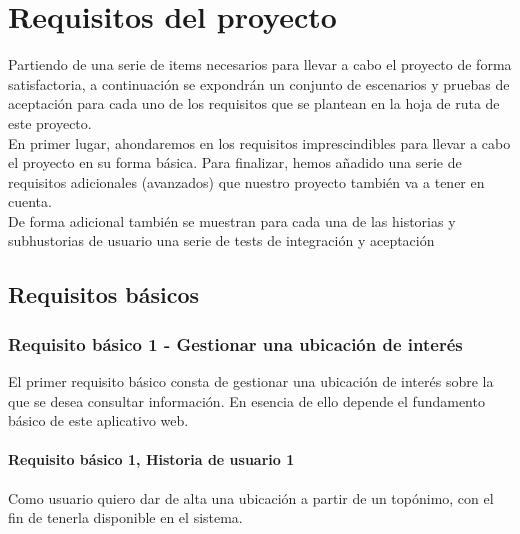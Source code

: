 \documentclass[../ei103948-project-documentation.tex]{subfiles}
\begin{document}
\section{Requisitos del proyecto}
	Partiendo de una serie de items necesarios para llevar a cabo el proyecto de forma satisfactoria, a continuación se expondrán un conjunto de escenarios y pruebas de aceptación para cada uno de los requisitos que se plantean en la hoja de ruta de este proyecto.\\

	En primer lugar, ahondaremos en los requisitos imprescindibles para llevar a cabo el proyecto en su forma básica. Para finalizar, hemos añadido una serie de requisitos adicionales (avanzados) que nuestro proyecto también va a tener en cuenta.\\

	De forma adicional también se muestran para cada una de las historias y subhustorias de usuario una serie de tests de integración y aceptación


		\subsection{Requisitos básicos}
			\subsubsection{Requisito básico 1 - Gestionar una ubicación de interés}
				El primer requisito básico consta de gestionar una ubicación de interés sobre la que se desea consultar información. En esencia de ello depende el fundamento básico de este aplicativo web.

				\paragraph{Requisito básico 1, Historia de usuario 1}
					Como usuario quiero dar de alta una ubicación a partir de un topónimo, con el fin de tenerla disponible en el sistema.
\end{document}
